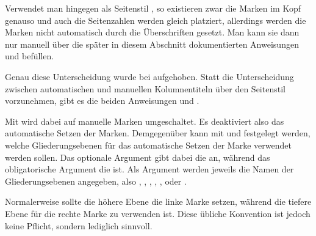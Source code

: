 {\begin{Explain}
      Verwendet man hingegen als Seitenstil
      , so
      existieren zwar die Marken im Kopf genauso und auch die Seitenzahlen
      werden gleich platziert, allerdings werden die Marken nicht automatisch
      durch die Überschriften gesetzt. Man kann sie dann nur
      manuell
      über die später in diesem Abschnitt dokumentierten Anweisungen
       und
       befüllen.
    \end{Explain}\par%
  }{%
  }%
  Genau diese Unterscheidung wurde bei %
  \iffalse \Package{scrpage2} und nun auch bei \fi%
  \hyperref[cha:scrlayer]{}
  aufgehoben. Statt die Unterscheidung zwischen
  automatischen und manuellen
  Kolumnentiteln über den Seitenstil vorzunehmen, gibt es die beiden
  Anweisungen  und .

  Mit  wird dabei auf manuelle
  Marken umgeschaltet. Es deaktiviert also das automatische Setzen der
  Marken. Demgegenüber kann mit 
  und  festgelegt werden, welche Gliederungsebenen für das
  automatische Setzen der Marke verwendet werden sollen. Das optionale
  Argument gibt dabei die  an,
  während das obligatorische Argument die  ist. Als Argument werden jeweils die Namen der Gliederungsebenen
  angegeben, also , , ,
  , ,  oder
  .

  Normalerweise sollte die höhere Ebene die linke Marke setzen, während die
  tiefere Ebene für die rechte Marke zu verwenden ist. Diese übliche
  Konvention ist jedoch keine Pflicht, sondern lediglich sinnvoll.

